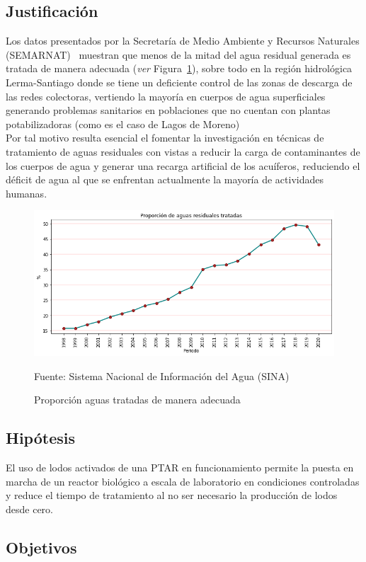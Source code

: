 \subsection*{Justificación}
Los datos presentados por la Secretaría de Medio Ambiente y Recursos Naturales (SEMARNAT)~\emph{\citep{Sis22}} muestran que menos de la mitad del agua residual generada es tratada de manera adecuada (\emph{ver} Figura~\ref{fig:proporcion}), sobre todo en la región hidrológica Lerma-Santiago donde se tiene un deficiente control de las zonas de descarga de las redes colectoras, vertiendo la mayoría en cuerpos de agua superficiales generando problemas sanitarios en poblaciones que no cuentan con plantas potabilizadoras (como es el caso de Lagos de Moreno)~\emph{\citep{aa2030}}\\
Por tal motivo resulta esencial el fomentar la investigación en técnicas de tratamiento de aguas residuales con vistas a reducir la carga de contaminantes de los cuerpos de agua y generar una recarga artificial de los acuíferos, reduciendo el déficit de agua al que se enfrentan actualmente la mayoría de actividades humanas.
	\begin{figure}[h]
		\centering
		\includegraphics[scale=0.3]{Proporcion_aguas_tratadas.png}
		\caption{Proporción aguas tratadas de manera adecuada}
		\label{fig:proporcion}
		\small{Fuente: Sistema Nacional de Información del Agua (SINA)}
	\end{figure}
\subsection*{Hipótesis}
El uso de lodos activados de una PTAR en funcionamiento permite la puesta en marcha de un reactor biológico a escala de laboratorio en condiciones controladas y reduce el tiempo de tratamiento al no ser necesario la producción de lodos desde cero.
\subsection*{Objetivos}
